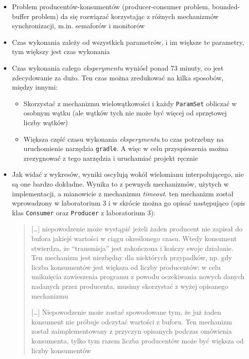 \documentclass[11pt]{article}
\providecommand{\tightlist}{%
      \setlength{\itemsep}{0pt}\setlength{\parskip}{0pt}}
\begin{document}
\begin{itemize}
\item
  Problem producentów-konsumentów (producer-consumer problem,
  bounded-buffer problem) da się rozwiązać korzystając z różnych
  mechanizmów synchronizacji, m.in. semaforów i monitorów
\item
  Czas wykonania zależy od wszystkich parametrów, i im większe te
  parametry, tym większy jest czas wykonania
\item
  Czas wykonania całego \emph{eksperymentu} wyniósł ponad 73 minuty, co
  jest zdecydowanie za dużo. Ten czas można zredukować na kilka
  sposobów, między innymi:

  \begin{itemize}
  \tightlist
  \item
    Skorzystać z mechanizmu wielowątkowości i każdy \texttt{ParamSet}
    obliczać w osobnym wątku (ale wątków tych nie może być więcej od
    sprzętowej liczby wątków)
  \item
    Większa część czasu wykonania \emph{eksperymentu} to czas potrzebny
    na uruchomienie narzędzia \texttt{gradle}. A więc w celu
    przyspieszenia można zrezygnować z tego narzędzia i uruchamiać
    projekt ręcznie
  \end{itemize}
\item
  Jak widać z wykresów, wyniki oscylują wokół wielomianu
  interpolującego, nie są one bardzo dokładne. Wynika to z pewnych
  mechanizmów, użytych w implementacji, a mianowicie z mechanizmu
  \emph{timeout}. ten mechanizm został wprowadzony w laboratorium 3 i w
  skrócie można go opisać następująco (opis klas \texttt{Consumer} oraz
  \texttt{Producer} z laboratorium 3):

  \begin{quote}
  {[}\ldots{]} niepowodzenie może wystąpić jeżeli żaden producent nie
  zapisał do bufora jakiejś wartości w ciągu określonego czasu. Wtedy
  konsument stwierdza, że ``transmisja'' jest zakończona i kończy swoje
  działanie. Ten mechanizm jest niezbędny dla niektórych przypadków, np.
  gdy liczba konsumentów jest większa od liczby producentów: w celu
  uniknięcia zawieszenia programu z powodu oczekiwania nowych danych
  nadanych przez producenta, musimy skorzystać z wyżej opisanego
  mechanizmu

  {[}\ldots{]} Niepowodzenie może zostać spowodowane tym, że już żaden
  konsument nie próbuje odczytać wartości z buforu. Ten mechanizm został
  zaimplementowany z przyczyn opisanych podczas omówienia konsumenta,
  tylko tym razem liczba producentów może być większa od liczby
  konsumentów
  \end{quote}


\end{itemize}
\end{document}
